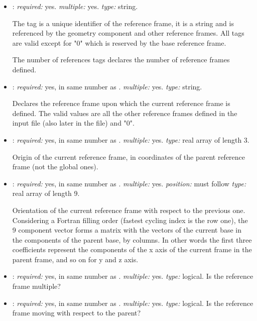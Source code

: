 \begin{itemize}
\item {}: \textit{required:} yes. \textit{multiple:} yes. \textit{type:} string.

The tag is a unique identifier of the reference frame, it is a string and is referenced by the geometry component and other reference frames. All tags are valid except for "0" which is reserved by the base reference frame. 

The number of references tags declares the number of reference frames defined.

\item {}: \textit{required:} yes, in same number as . \textit{multiple:} yes. \textit{type:} string.

Declares the reference frame upon which the current reference frame is defined. The valid values are all the other reference frames defined in the input file (also later in the file) and "0". 

\item {}: \textit{required:} yes, in same number as . \textit{multiple:} yes. \textit{type:} real array of length 3.

Origin of the current reference frame, in coordinates of the parent reference frame (not the global ones). 

\item {}: \textit{required:} yes, in same number as . \textit{multiple:} yes. \textit{position:} must follow  \textit{type:} real array of length 9.

Orientation of the current reference frame with respect to the previous one. Considering a Fortran filling order (fastest cycling index is the row one), the 9 component vector forms a matrix with the vectors of the current base in the components of the parent base, by columns. In other words the first three coefficients represent the components of the x axis of the current frame in the parent frame, and so on for y and z axis. 
 
\item {}: \textit{required:} yes, in same number as . \textit{multiple:} yes. \textit{type:} logical.
 Is the reference frame multiple? 

\item {}: \textit{required:} yes, in same number as . \textit{multiple:} yes. \textit{type:} logical.
 Is the reference frame moving with respect to the parent? 
\end{itemize}

